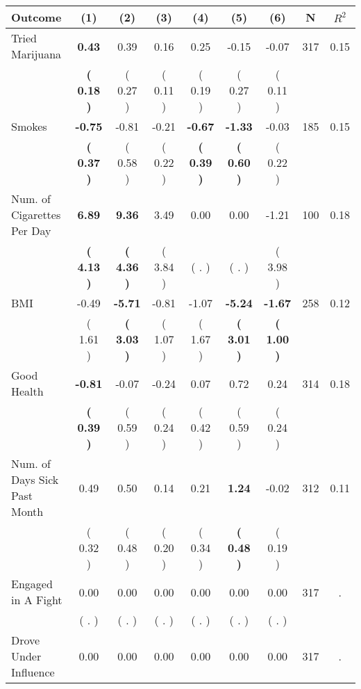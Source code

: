 \begin{tabular}{lcccccccc}
\toprule
 \textbf{Outcome} & \textbf{(1)} & \textbf{(2)} & \textbf{(3)} & \textbf{(4)} & \textbf{(5)} & \textbf{(6)} & \textbf{N} & \textbf{$ R^2$} \\
\midrule
Tried Marijuana & \textbf{     0.43} &      0.39 &      0.16 &      0.25 &     -0.15 &     -0.07 & 317 &       0.15 \\ 
 & \textbf{(     0.18 )} & (     0.27 ) & (     0.11 ) & (     0.19 ) & (     0.27 ) & (     0.11 ) & \\
Smokes & \textbf{    -0.75} &     -0.81 &     -0.21 & \textbf{    -0.67} & \textbf{    -1.33} &     -0.03 & 185 &       0.15 \\ 
 & \textbf{(     0.37 )} & (     0.58 ) & (     0.22 ) & \textbf{(     0.39 )} & \textbf{(     0.60 )} & (     0.22 ) & \\
Num. of Cigarettes Per Day & \textbf{     6.89} & \textbf{     9.36} &      3.49 &      0.00 &      0.00 &     -1.21 & 100 &       0.18 \\ 
 & \textbf{(     4.13 )} & \textbf{(     4.36 )} & (     3.84 ) & (        . ) & (        . ) & (     3.98 ) & \\
BMI &     -0.49 & \textbf{    -5.71} &     -0.81 &     -1.07 & \textbf{    -5.24} & \textbf{    -1.67} & 258 &       0.12 \\ 
 & (     1.61 ) & \textbf{(     3.03 )} & (     1.07 ) & (     1.67 ) & \textbf{(     3.01 )} & \textbf{(     1.00 )} & \\
Good Health & \textbf{    -0.81} &     -0.07 &     -0.24 &      0.07 &      0.72 &      0.24 & 314 &       0.18 \\ 
 & \textbf{(     0.39 )} & (     0.59 ) & (     0.24 ) & (     0.42 ) & (     0.59 ) & (     0.24 ) & \\
Num. of Days Sick Past Month &      0.49 &      0.50 &      0.14 &      0.21 & \textbf{     1.24} &     -0.02 & 312 &       0.11 \\ 
 & (     0.32 ) & (     0.48 ) & (     0.20 ) & (     0.34 ) & \textbf{(     0.48 )} & (     0.19 ) & \\
Engaged in A Fight &      0.00 &      0.00 &      0.00 &      0.00 &      0.00 &      0.00 & 317 &          . \\ 
 & (        . ) & (        . ) & (        . ) & (        . ) & (        . ) & (        . ) & \\
Drove Under Influence &      0.00 &      0.00 &      0.00 &      0.00 &      0.00 &      0.00 & 317 &          . \\ 

\end{tabular}
